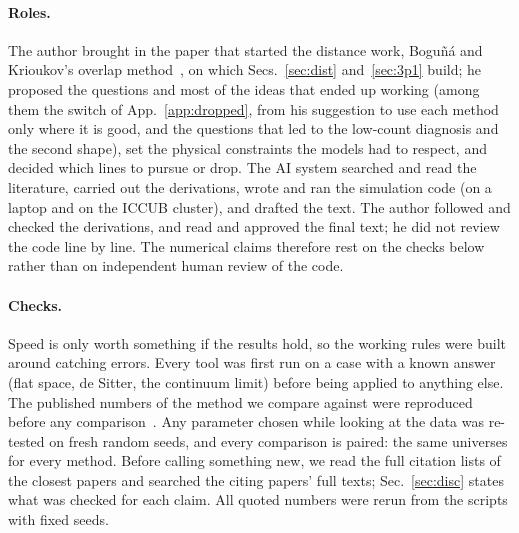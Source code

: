 \documentclass[11pt,a4paper]{article}
\begin{document}
\paragraph{Roles.} The author brought in the paper that started the distance work, Bogu\~n\'a and Krioukov's overlap method~\cite{BK24}, on which Secs.~\ref{sec:dist} and~\ref{sec:3p1} build; he proposed the questions and most of the ideas that ended up working (among them the switch of App.~\ref{app:dropped}, from his suggestion to use each method only where it is good, and the questions that led to the low-count diagnosis and the second shape), set the physical constraints the models had to respect, and decided which lines to pursue or drop. The AI system searched and read the literature, carried out the derivations, wrote and ran the simulation code (on a laptop and on the ICCUB cluster), and drafted the text. The author followed and checked the derivations, and read and approved the final text; he did not review the code line by line. The numerical claims therefore rest on the checks below rather than on independent human review of the code.

\paragraph{Checks.} Speed is only worth something if the results hold, so the working rules were built around catching errors. Every tool was first run on a case with a known answer (flat space, de Sitter, the continuum limit) before being applied to anything else. The published numbers of the method we compare against were reproduced before any comparison~\cite{Johnston25}. Any parameter chosen while looking at the data was re-tested on fresh random seeds, and every comparison is paired: the same universes for every method. Before calling something new, we read the full citation lists of the closest papers and searched the citing papers' full texts; Sec.~\ref{sec:disc} states what was checked for each claim. All quoted numbers were rerun from the scripts with fixed seeds.
\end{document}
